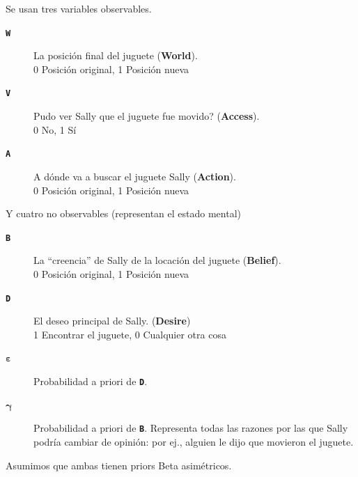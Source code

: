 \documentclass{beamer}
\begin{document}
\begin{frame}
\vspace{1em}
Se usan tres variables observables.
\begin{description}
	\item[\texttt{\textbf{W}}] La posición final del juguete (\textbf{World}).  \\
		0 \textrightarrow{}  Posición original, 1 \textrightarrow{}  Posición nueva

	\item[\texttt{\textbf{V}}] Pudo ver Sally que el juguete fue movido? (\textbf{Access}). \\
		0 \textrightarrow{}  No, 1 \textrightarrow{}  Sí

	\item[\texttt{\textbf{A}}] A dónde va a buscar el juguete Sally (\textbf{Action}). \\
		0 \textrightarrow{}  Posición original, 1 \textrightarrow{}  Posición nueva
\end{description}

Y cuatro no observables (representan el estado mental)
\begin{description}
	\item[\texttt{\textbf{B}}] La ``creencia'' de Sally de la locación del juguete (\textbf{Belief}). \\
		0 \textrightarrow{} Posición original, 1 \textrightarrow{} Posición nueva

	\item[\texttt{\textbf{D}}] El deseo principal de Sally. (\textbf{Desire}) \\
		1 \textrightarrow{}  Encontrar el juguete, 0 \textrightarrow{}  Cualquier otra cosa

\end{description}
\end{frame}

\begin{frame}
\begin{description}
	\item[\(\boldsymbol{\varepsilon}\)] Probabilidad a priori de \texttt{\textbf{D}}.
	\item[\(\boldsymbol{\gamma}\)] Probabilidad a priori de \texttt{\textbf{B}}. Representa todas las razones por las que Sally podría cambiar de opinión: por ej., alguien le dijo que movieron el juguete.
\end{description}

Asumimos que ambas tienen priors Beta asimétricos.
\end{frame}
\end{document}
